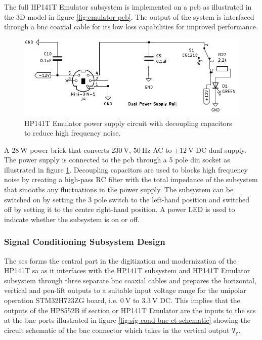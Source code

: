 \documentclass[class=report,11pt,crop=false]{standalone}
\begin{document}
	The full HP141T Emulator subsystem is implemented on a \acrshort{pcb} as illustrated in the 3D model in figure \ref{fig:emulator-pcb}. The output of the system is interfaced through a \acrshort{bnc} coaxial cable for its low loss capabilities for improved performance. 
	
	\begin{figure}[h!]
		\centering
		\includegraphics[width=0.55\linewidth]{Figures/Methodology/emulator-power-supply}
		\caption{HP141T Emulator power supply circuit with decoupling capacitors to reduce high frequency noise.}
		\label{fig:emulator-power-ct}
	\end{figure}
	
	A $\SI{28}{\watt}$ power brick that converts $\SI{230}{\volt}$, $\SI{50}{\hertz}$ AC to $\pm\SI{12}{\volt}$ DC dual supply. The power supply is connected to the \acrshort{pcb} through a 5 pole din socket as illustrated in figure \ref{fig:emulator-power-ct}. Decoupling capacitors are used to blocks high frequency noise by creating a high-pass RC filter with the total impedance of the subsystem that smooths any fluctuations in the power supply. The subsystem can be switched on by setting the 3 pole switch to the left-hand position and switched off by setting it to the centre right-hand position. A power LED is used to indicate whether the subsystem is on or off. 
	
	\subsubsection{Signal Conditioning Subsystem Design}
	
	The \acrshort{scs} forms the central part in the digitization and modernization of the HP141T \acrshort{sa} as it interfaces with the HP141T subsystem and HP141T Emulator subsystem through three separate \acrshort{bnc} coaxial cables and prepares the horizontal, vertical and pen-lift outputs to a suitable input voltage range for the unipolar operation STM32H723ZG board, i.e. $\SI{0}{\volt}$ to $\SI{3.3}{\volt}$ DC. This implies that the outputs of the HP8552B \acrshort{if} section or HP141T Emulator are the inputs to the \acrshort{scs} at the \acrshort{bnc} ports  illustrated in figure \ref{fig:sig-cond-bnc-ct-schematic} showing the circuit schematic of the \acrshort{bnc} connector which takes in the vertical output $\texttt{V}_\texttt{y}$. 
	
\end{document}

